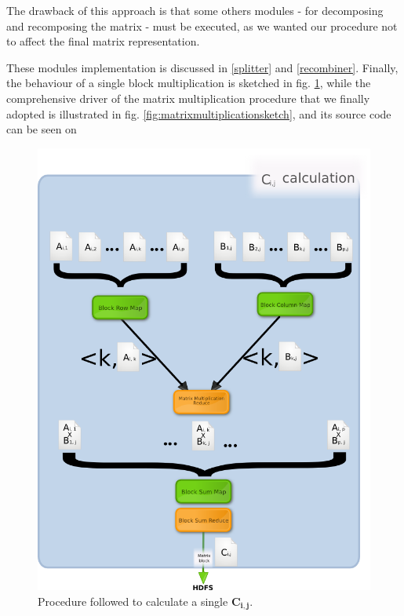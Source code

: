 The drawback of this approach is that some others modules - for decomposing and recomposing the matrix - must be executed, as we wanted our procedure not to affect the final matrix representation.

These modules implementation is discussed in \ref{splitter} and \ref{recombiner}.
Finally, the behaviour of a single block multiplication is sketched in fig. \ref{fig:blockmultiplicationsketch}, while
the comprehensive driver of the matrix multiplication procedure that we finally adopted is illustrated in fig. \ref{fig:matrixmultiplicationsketch}, and its source code can be seen on %

\begin{figure}
\centering
\includegraphics[scale=0.7]{blockmultiplication.png}
\caption{Procedure followed to calculate a single $\mathbf{C_{i,j}}$.}
\label{fig:blockmultiplicationsketch}
\end{figure}

